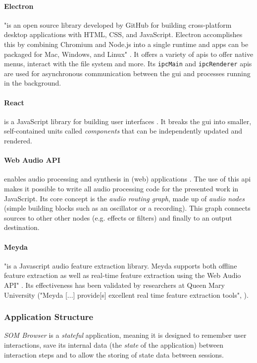 \paragraph*{Electron}
\label{para:electron}
"is an open source library developed by GitHub for building cross-platform
desktop applications with HTML, CSS, and JavaScript. Electron accomplishes this
by combining Chromium and Node.js into a single runtime and apps can be
packaged for Mac, Windows, and Linux" \citep{electron2019}. It offers a variety
of \glspl{api} to offer native menus, interact with the file system and more.
Its \texttt{ipcMain} and \texttt{ipcRenderer} \glspl{api} are used for
asynchronous communication between the \gls{gui} and processes running in the
background.

\paragraph*{React}
\label{para:react}
is a JavaScript library for building user interfaces \citep{react2019}. It
breaks the \gls{gui} into smaller, self-contained units called
\textit{components} that can be independently updated and rendered.

\paragraph*{Web Audio API}
\label{para:web_audio_api}
enables audio processing and synthesis in (web) applications
\citep{webaudio2019}. The use of this \gls{api} makes it possible to write all
audio processing code for the presented work in JavaScript. Its core concept is
the \textit{audio routing graph}, made up of \textit{audio nodes} (simple
building blocks such as an oscillator or a recording). This graph connects
sources to other other nodes (e.g. effects or filters) and finally to an output
destination.

\paragraph*{Meyda}
\label{para:meyda}
"is a Javascript audio feature extraction library. Meyda supports both offline
feature extraction as well as real-time feature extraction using the Web Audio
API" \citep{web:meyda2019}. Its effectiveness has been validated by researchers
at Queen Mary University ("Meyda [...] provide[s] excellent real time feature
extraction tools", \citet{moffat2015}).

\subsubsection{Application Structure}
\label{subsubsec:som-browser_structure}
\textit{SOM Browser} is a \textit{stateful} application, meaning it is designed
to remember user interactions, save its internal data (the \textit{state} of
the application) between interaction steps and to allow the storing of state
data between sessions.

